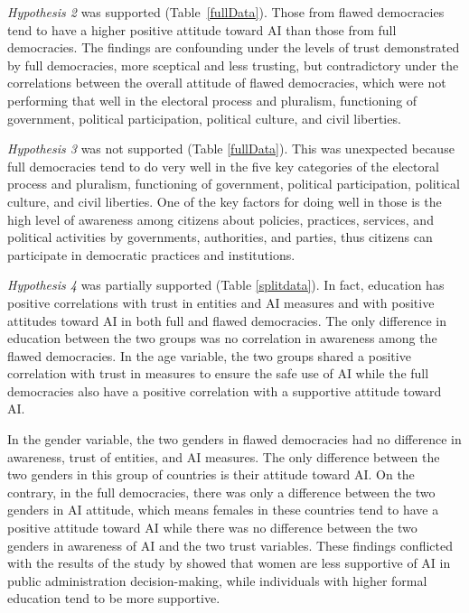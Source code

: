 \documentclass[
]{ceurart}
\begin{document}
\textit{Hypothesis 2} was supported 
(Table~\ref{fullData}). Those from flawed democracies tend to have a higher positive attitude toward AI than those from full democracies. The findings are confounding under the levels of trust demonstrated by full democracies, more sceptical and less trusting, but contradictory under the correlations between the overall attitude of flawed democracies, which were not performing that well in the electoral process and pluralism, functioning of government, political participation, political culture, and civil liberties.

\textit{Hypothesis 3} was not supported (Table \ref{fullData}). This was unexpected because full democracies tend to do very well in the five key categories of the electoral process and pluralism, functioning of government, political participation, political culture, and civil liberties. One of the key factors for doing well in those is the high level of awareness among citizens about policies, practices, services, and political activities by governments, authorities, and parties, thus citizens
can participate in democratic practices and institutions.

\textit{Hypothesis 4} was partially supported (Table \ref{splitdata}). In fact, education has positive correlations with trust in entities and AI measures and with positive attitudes toward AI in both full and flawed democracies. The only difference in education between the two groups was no correlation in awareness among the flawed democracies. In the age variable, the two groups shared a positive correlation with trust in measures to ensure the safe use of AI while the full democracies also have a positive correlation with a supportive attitude toward AI.

In the gender variable, the two genders in flawed democracies had no difference in awareness, trust of entities, and AI measures. The only difference between the two genders in this group of countries is their attitude toward AI. On the contrary, in the full democracies, there was only a difference between the two genders in AI attitude, which means females in these countries tend to have a positive attitude toward AI while there was no difference between the two genders in awareness of AI and the two trust variables. These findings conflicted with the results of the study by \cite{konig2022citizen} showed that women are less supportive of AI in public administration decision-making, while individuals with higher formal education tend to be more supportive.
\end{document}
